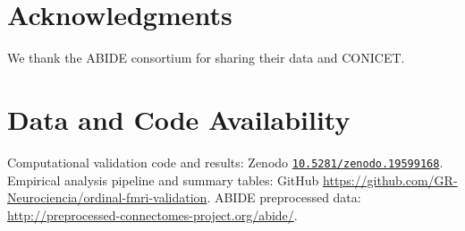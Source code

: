 \documentclass[12pt,a4paper]{article}
\begin{document}
	\section*{Acknowledgments}
	We thank the ABIDE consortium for sharing their data and CONICET.
	
	\section*{Data and Code Availability}
	Computational validation code and results: Zenodo \href{https://doi.org/10.5281/zenodo.19599168}{\texttt{10.5281/zenodo.19599168}}. Empirical analysis pipeline and summary tables: GitHub \url{https://github.com/GR-Neurociencia/ordinal-fmri-validation}. ABIDE preprocessed data: \url{http://preprocessed-connectomes-project.org/abide/}.
	
\end{document}

